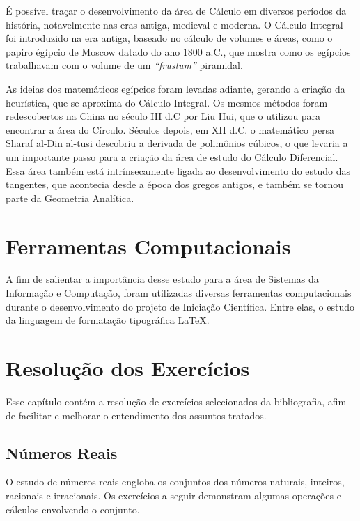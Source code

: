 \documentclass[12 pt, openright, twoside, a4paper, english, french, spanish, brazil]{abntex2}
\begin{document}
É possível traçar o desenvolvimento da área de Cálculo em diversos períodos da história, notavelmente nas eras antiga, medieval e moderna. O Cálculo Integral foi introduzido na era antiga, baseado no cálculo de volumes e áreas, como o papiro égípcio de Moscow datado do ano 1800 a.C., que mostra como os egípcios trabalhavam com o volume de um \textit{``frustum''} piramidal.

As ideias dos matemáticos egípcios foram levadas adiante, gerando a criação da heurística, que se aproxima do Cálculo Integral. Os mesmos métodos foram redescobertos na China no século III d.C por Liu Hui, que o utilizou para encontrar a área do Círculo. 
Séculos depois, em XII d.C. o matemático persa Sharaf al-Din al-tusi descobriu a derivada de polimônios cúbicos, o que levaria a um importante passo para a criação da área de estudo do Cálculo Diferencial. Essa área também está intrínsecamente ligada ao desenvolvimento do estudo das tangentes, que acontecia desde a época dos gregos antigos, e também se tornou parte da Geometria Analítica. 

\chapter{Ferramentas Computacionais}

A fim de salientar a importância desse estudo para a área de Sistemas da Informação e Computação, foram utilizadas diversas ferramentas computacionais durante o desenvolvimento do projeto de Iniciação Científica. Entre elas, o estudo da linguagem de formatação tipográfica \LaTeX.

\chapter{Resolução dos Exercícios}

Esse capítulo contém a resolução de exercícios selecionados da bibliografia, afim de facilitar e melhorar o entendimento dos assuntos tratados.

\section{Números Reais}

O estudo de números reais engloba os conjuntos dos números naturais, inteiros, racionais e irracionais. Os exercícios a seguir demonstram algumas operações e cálculos envolvendo o conjunto. 
\end{document}
